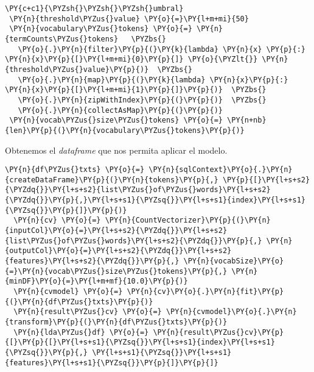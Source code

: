 \vspace{0.5cm}

   \begin{tcolorbox}[breakable, size=fbox, boxrule=1pt, pad at break*=1mm,colback=cellbackground, colframe=cellborder]
 \begin{Verbatim}[commandchars=\\\{\}]
 \PY{c+c1}{\PYZsh{}\PYZsh{}\PYZsh{}umbral}
 \PY{n}{threshold\PYZus{}value} \PY{o}{=}\PY{l+m+mi}{50} 
 \PY{n}{vocabulary\PYZus{}tokens} \PY{o}{=} \PY{n}{termCounts\PYZus{}tokens}   \PYZbs{}
   \PY{o}{.}\PY{n}{filter}\PY{p}{(}\PY{k}{lambda} \PY{n}{x} \PY{p}{:} \PY{n}{x}\PY{p}{[}\PY{l+m+mi}{0}\PY{p}{]} \PY{o}{\PYZlt{}} \PY{n}{threshold\PYZus{}value}\PY{p}{)}  \PYZbs{}
   \PY{o}{.}\PY{n}{map}\PY{p}{(}\PY{k}{lambda} \PY{n}{x}\PY{p}{:} \PY{n}{x}\PY{p}{[}\PY{l+m+mi}{1}\PY{p}{]}\PY{p}{)}  \PYZbs{}
   \PY{o}{.}\PY{n}{zipWithIndex}\PY{p}{(}\PY{p}{)}  \PYZbs{}
   \PY{o}{.}\PY{n}{collectAsMap}\PY{p}{(}\PY{p}{)}
 \PY{n}{vocab\PYZus{}size\PYZus{}tokens} \PY{o}{=} \PY{n+nb}{len}\PY{p}{(}\PY{n}{vocabulary\PYZus{}tokens}\PY{p}{)}
 \end{Verbatim}
 \end{tcolorbox}

Obtenemos el \textit{dataframe} que nos permita  aplicar el modelo.

\vspace{0.5cm}

     \begin{tcolorbox}[breakable, size=fbox, boxrule=1pt, pad at break*=1mm,colback=cellbackground, colframe=cellborder]
  \begin{Verbatim}[commandchars=\\\{\}]
  \PY{n}{df\PYZus{}txts} \PY{o}{=} \PY{n}{sqlContext}\PY{o}{.}\PY{n}{createDataFrame}\PY{p}{(}\PY{n}{tokens}\PY{p}{,} \PY{p}{[}\PY{l+s+s2}{\PYZdq{}}\PY{l+s+s2}{list\PYZus{}of\PYZus{}words}\PY{l+s+s2}{\PYZdq{}}\PY{p}{,}\PY{l+s+s1}{\PYZsq{}}\PY{l+s+s1}{index}\PY{l+s+s1}{\PYZsq{}}\PY{p}{]}\PY{p}{)}
  \PY{n}{cv} \PY{o}{=} \PY{n}{CountVectorizer}\PY{p}{(}\PY{n}{inputCol}\PY{o}{=}\PY{l+s+s2}{\PYZdq{}}\PY{l+s+s2}{list\PYZus{}of\PYZus{}words}\PY{l+s+s2}{\PYZdq{}}\PY{p}{,} \PY{n}{outputCol}\PY{o}{=}\PY{l+s+s2}{\PYZdq{}}\PY{l+s+s2}{features}\PY{l+s+s2}{\PYZdq{}}\PY{p}{,} \PY{n}{vocabSize}\PY{o}{=}\PY{n}{vocab\PYZus{}size\PYZus{}tokens}\PY{p}{,} \PY{n}{minDF}\PY{o}{=}\PY{l+m+mf}{10.0}\PY{p}{)}
  \PY{n}{cvmodel} \PY{o}{=} \PY{n}{cv}\PY{o}{.}\PY{n}{fit}\PY{p}{(}\PY{n}{df\PYZus{}txts}\PY{p}{)}
  \PY{n}{result\PYZus{}cv} \PY{o}{=} \PY{n}{cvmodel}\PY{o}{.}\PY{n}{transform}\PY{p}{(}\PY{n}{df\PYZus{}txts}\PY{p}{)}
  \PY{n}{lda\PYZus{}df} \PY{o}{=} \PY{n}{result\PYZus{}cv}\PY{p}{[}\PY{p}{[}\PY{l+s+s1}{\PYZsq{}}\PY{l+s+s1}{index}\PY{l+s+s1}{\PYZsq{}}\PY{p}{,} \PY{l+s+s1}{\PYZsq{}}\PY{l+s+s1}{features}\PY{l+s+s1}{\PYZsq{}}\PY{p}{]}\PY{p}{]}
  \end{Verbatim}
  \end{tcolorbox}
  

